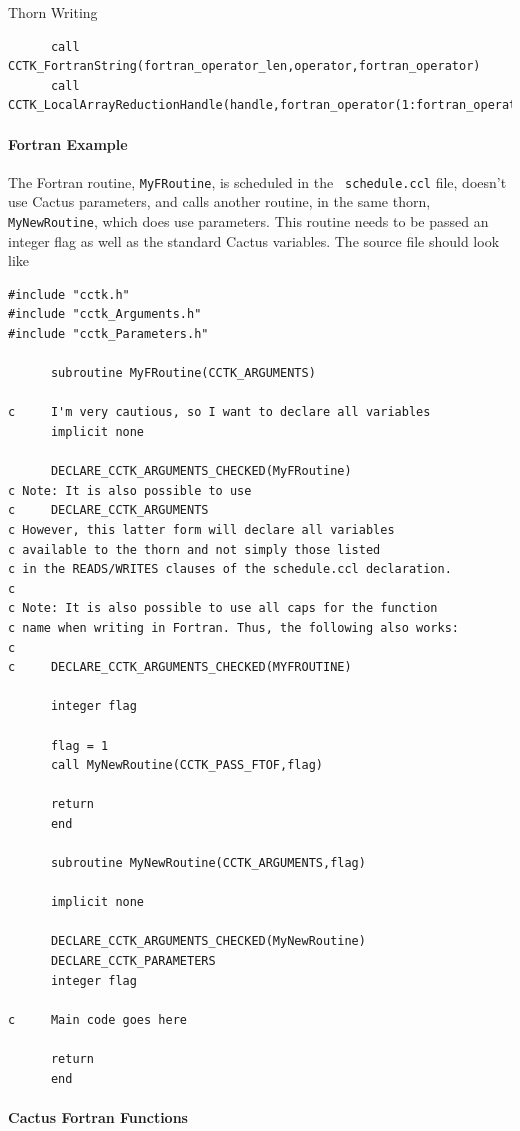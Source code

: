 \begin{cactuspart}{Thorn Writing}
\begin{verbatim}
      call CCTK_FortranString(fortran_operator_len,operator,fortran_operator)
      call CCTK_LocalArrayReductionHandle(handle,fortran_operator(1:fortran_operator_len))
\end{verbatim}



\paragraph{Fortran Example}

The Fortran routine, \verb|MyFRoutine|, is scheduled in the {\tt
schedule.ccl} file, doesn't use Cactus parameters, and calls another
routine, in the same thorn, \verb|MyNewRoutine|, which does use
parameters.  This routine needs to be passed an integer flag as well
as the standard Cactus variables. The source file should look like
%
\begin{verbatim}
#include "cctk.h"
#include "cctk_Arguments.h"
#include "cctk_Parameters.h"

      subroutine MyFRoutine(CCTK_ARGUMENTS)

c     I'm very cautious, so I want to declare all variables
      implicit none

      DECLARE_CCTK_ARGUMENTS_CHECKED(MyFRoutine)
c Note: It is also possible to use
c     DECLARE_CCTK_ARGUMENTS
c However, this latter form will declare all variables
c available to the thorn and not simply those listed
c in the READS/WRITES clauses of the schedule.ccl declaration.
c
c Note: It is also possible to use all caps for the function
c name when writing in Fortran. Thus, the following also works:
c
c     DECLARE_CCTK_ARGUMENTS_CHECKED(MYFROUTINE)

      integer flag

      flag = 1
      call MyNewRoutine(CCTK_PASS_FTOF,flag)

      return
      end

      subroutine MyNewRoutine(CCTK_ARGUMENTS,flag)

      implicit none

      DECLARE_CCTK_ARGUMENTS_CHECKED(MyNewRoutine)
      DECLARE_CCTK_PARAMETERS
      integer flag

c     Main code goes here

      return
      end

\end{verbatim}

\paragraph{Cactus Fortran Functions}


\end{cactuspart}
